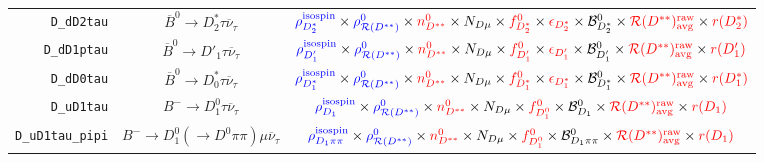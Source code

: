 \begin{landscape}
\begin{table}
\begin{tabular}{r|c|c}
       \texttt{D\_dD2tau} &             $\overline{B}^0 \rightarrow D^*_2 \tau \overline{\nu}_\tau$              &     $\textcolor{blue}{\rho^\text{isospin}_{D_2^*}} \times \textcolor{blue}{\rho_{\mathcal{R}(D^{**})}^0} \times \textcolor{red}{n^{0}_{D^{**}}} \times N_{D \mu} \times \textcolor{red}{f^{0}_{D_2^*}} \times \textcolor{red}{\epsilon_{D_2^*}} \times \mathcal{B}^{0}_{D_2^*} \times \textcolor{red}{\mathcal{R}(D^{**})_\text{avg}^\text{raw}} \times \textcolor{red}{r({D_2^*})}$     \\
      \texttt{D\_dD1ptau} &              $\overline{B}^0 \rightarrow D'_1 \tau \overline{\nu}_\tau$              &       $\textcolor{blue}{\rho^\text{isospin}_{D'_1}} \times \textcolor{blue}{\rho_{\mathcal{R}(D^{**})}^0} \times \textcolor{red}{n^{0}_{D^{**}}} \times N_{D \mu} \times \textcolor{red}{f^{0}_{D'_1}} \times \textcolor{red}{\epsilon_{D'_1}} \times \mathcal{B}^{0}_{D'_1} \times \textcolor{red}{\mathcal{R}(D^{**})_\text{avg}^\text{raw}} \times \textcolor{red}{r({D'_1})}$        \\
       \texttt{D\_dD0tau} &             $\overline{B}^0 \rightarrow D^*_0 \tau \overline{\nu}_\tau$              &     $\textcolor{blue}{\rho^\text{isospin}_{D_1^*}} \times \textcolor{blue}{\rho_{\mathcal{R}(D^{**})}^0} \times \textcolor{red}{n^{0}_{D^{**}}} \times N_{D \mu} \times \textcolor{red}{f^{0}_{D_1^*}} \times \textcolor{red}{\epsilon_{D_1^*}} \times \mathcal{B}^{0}_{D_1^*} \times \textcolor{red}{\mathcal{R}(D^{**})_\text{avg}^\text{raw}} \times \textcolor{red}{r({D_1^*})}$     \\
       \texttt{D\_uD1tau} &                   $B^- \rightarrow D_1^0 \tau \overline{\nu}_\tau$                   &                            $\textcolor{blue}{\rho^\text{isospin}_{D_1}} \times \textcolor{blue}{\rho_{\mathcal{R}(D^{**})}^0} \times \textcolor{red}{n^{0}_{D^{**}}} \times N_{D \mu} \times \textcolor{red}{f^{0}_{D_1^0}} \times \mathcal{B}^{0}_{D_1} \times \textcolor{red}{\mathcal{R}(D^{**})_\text{avg}^\text{raw}} \times \textcolor{red}{r({D_1})}$                             \\
 \texttt{D\_uD1tau\_pipi} &       $B^- \rightarrow D_1^0 (\rightarrow D^0 \pi\pi) \mu \overline{\nu}_\tau$       &                      $\textcolor{blue}{\rho^\text{isospin}_{D_1\pi\pi}} \times \textcolor{blue}{\rho_{\mathcal{R}(D^{**})}^0} \times \textcolor{red}{n^{0}_{D^{**}}} \times N_{D \mu} \times \textcolor{red}{f^{0}_{D_1^0}} \times \mathcal{B}^{0}_{D_1\pi\pi} \times \textcolor{red}{\mathcal{R}(D^{**})_\text{avg}^\text{raw}} \times \textcolor{red}{r({D_1})}$                       \\

\end{tabular}
\end{table}
\end{landscape}
